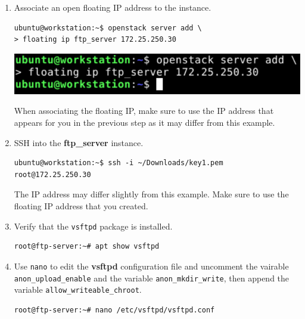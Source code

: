 \documentclass[letterpaper, 12pt]{article}
\begin{document}
\begin{enumerate}
    \item Associate an open floating IP address to the instance.
\begin{lstlisting}
ubuntu@workstation:~$ openstack server add \
> floating ip ftp_server 172.25.250.30
\end{lstlisting}

    \begin{center}
        \includegraphics[width=\linewidth]{images/part1/step36.png}
    \end{center}

    \begin{notebox}{}
        When associating the floating IP, make sure to use the IP address that appears for you in the previous step as
        it may differ from this example.
    \end{notebox}

    \item SSH into the \textbf{ftp\_server} instance.
\begin{lstlisting}
ubuntu@workstation:~$ ssh -i ~/Downloads/key1.pem root@172.25.250.30
\end{lstlisting}

    \begin{notebox}{}
        The IP address may differ slightly from this example. Make sure to use the floating IP address that you created.
    \end{notebox}

    \item Verify that the \texttt{vsftpd} package is installed.
\begin{lstlisting}
root@ftp-server:~# apt show vsftpd
\end{lstlisting}

    \item Use \texttt{nano} to edit the \textbf{vsftpd} configuration file and uncomment the vairable
    \texttt{anon\_upload\_enable} and the variable \texttt{anon\_mkdir\_write}, then append the variable
    \texttt{allow\_writeable\_chroot}.
\begin{lstlisting}
root@ftp-server:~# nano /etc/vsftpd/vsftpd.conf
\end{lstlisting}


\end{enumerate}
\end{document}
